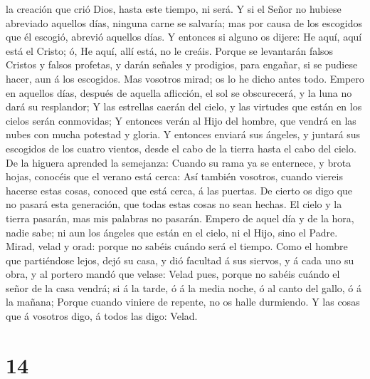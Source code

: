 la creación que crió Dios, hasta este tiempo, ni será.  Y
si el Señor no hubiese abreviado aquellos días, ninguna carne se
salvaría; mas por causa de los escogidos que él escogió, abrevió
aquellos días.  Y entonces si alguno os dijere: He aquí,
aquí está el Cristo; ó, He aquí, allí está, no le creáis. 
Porque se levantarán falsos Cristos y falsos profetas, y darán señales y
prodigios, para engañar, si se pudiese hacer, aun á los escogidos.
 Mas vosotros mirad; os lo he dicho antes todo.
 Empero en aquellos días, después de aquella aflicción, el
sol se obscurecerá, y la luna no dará su resplandor;  Y las
estrellas caerán del cielo, y las virtudes que están en los cielos serán
conmovidas;  Y entonces verán al Hijo del hombre, que
vendrá en las nubes con mucha potestad y gloria.  Y
entonces enviará sus ángeles, y juntará sus escogidos de los cuatro
vientos, desde el cabo de la tierra hasta el cabo del cielo.
 De la higuera aprended la semejanza: Cuando su rama ya se
enternece, y brota hojas, conocéis que el verano está cerca:
 Así también vosotros, cuando viereis hacerse estas cosas,
conoced que está cerca, á las puertas.  De cierto os digo
que no pasará esta generación, que todas estas cosas no sean hechas.
 El cielo y la tierra pasarán, mas mis palabras no pasarán.
 Empero de aquel día y de la hora, nadie sabe; ni aun los
ángeles que están en el cielo, ni el Hijo, sino el Padre. 
Mirad, velad y orad: porque no sabéis cuándo será el tiempo.
 Como el hombre que partiéndose lejos, dejó su casa, y dió
facultad á sus siervos, y á cada uno su obra, y al portero mandó que
velase:  Velad pues, porque no sabéis cuándo el señor de la
casa vendrá; si á la tarde, ó á la media noche, ó al canto del gallo, ó
á la mañana;  Porque cuando viniere de repente, no os halle
durmiendo.  Y las cosas que á vosotros digo, á todos las
digo: Velad.

\hypertarget{section-13}{%
\section{14}\label{section-13}}

